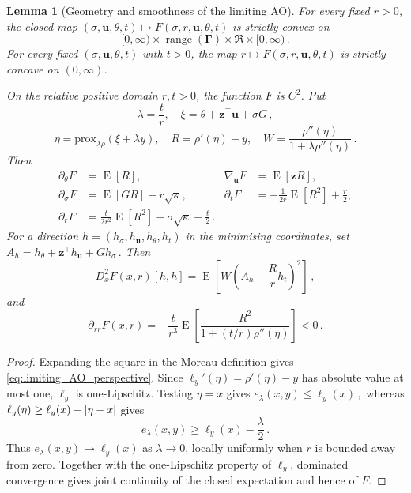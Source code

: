 \documentclass{article}
\makeatletter
\DeclareMathOperator{\expect}{E}
\newtheorem{lemma}{Lemma}
\theoremstyle{definition}
\newcommand{\abs}[1]{%
	\ensuremath{%
		\if@display
		\left| #1 \right|
		\else
		\lvert #1 \rvert
		\fi
	}%
}
\newcommand*{\bb}{\boldsymbol}
\newcommand{\prox}[2]{\ensuremath{\textrm{prox}_{#1}\left(#2\right)}}
\def\bu{\bb{u}}
\def\bz{\bb{z}}
\newcommand{\range}{\operatorname{range}}
\makeatother
\begin{document}
\begin{bibunit}
\begin{lemma}[Geometry and smoothness of the limiting AO]
For every fixed $r>0$, the closed map $(\sigma,\bu,\theta,t) \longmapsto F(\sigma,r,\bu,\theta,t)$
is strictly convex on
$$
    [0,\infty)
    \times\range(\bb\Gamma)
    \times\Re
    \times[0,\infty)\,.
$$
For every fixed $(\sigma,\bu,\theta,t)$ with $t>0$, the map $r\longmapsto F(\sigma,r,\bu,\theta,t)$
is strictly concave on $(0,\infty)$.

On the relative positive domain $r,t>0$, the function $F$ is $C^2$. Put
$$
    \lambda=\frac tr,
    \quad
    \xi=\theta+\bz^\top\bu+\sigma G\,,
$$
$$
    \eta
    =
    \prox{\lambda\rho}{\xi+\lambda y},
    \quad
    R=\rho'(\eta)-y,
    \quad
    W=
    \frac{\rho''(\eta)}{1+\lambda\rho''(\eta)}\,.
$$
Then
\begin{equation}
\label{eq:limiting_AO_gradient}
\begin{aligned}
    \partial_\theta F
    &=\expect[R],
    &
    \nabla_{\bu}F
    &=\expect[\bz R],
    \\
    \partial_\sigma F
    &=\expect[GR]-r\sqrt\kappa,
    &
    \partial_tF
    &=-\frac{1}{2r}\expect[R^2]+\frac r2,
    \\
    \partial_rF
    &=\frac{t}{2r^2}\expect[R^2]
      -\sigma\sqrt\kappa+\frac t2\,.
\end{aligned}
\end{equation}
For a direction $h=(h_\sigma,h_{\bu},h_\theta,h_t)$
in the minimising coordinates, set $A_h=h_\theta+\bz^\top h_{\bu}+Gh_\sigma\,.$
Then
\begin{equation}
\label{eq:limiting_AO_min_hessian}
    D_x^2F(x,r)[h,h]
    =
    \expect\left[
        W
        \left(
            A_h-\frac{R}{r}h_t
        \right)^2
    \right]\,,
\end{equation}
and
\begin{equation}
\label{eq:limiting_AO_r_hessian}
    \partial_{rr}F(x,r)
    =
    -\frac{t}{r^3}
    \expect\left[
        \frac{R^2}
        {1+(t/r)\rho''(\eta)}
    \right] <0\,.
\end{equation}
\end{lemma}

\begin{proof}
Expanding the square in the Moreau definition gives
\eqref{eq:limiting_AO_perspective}. Since $\ell_y'(\eta)=\rho'(\eta)-y$
has absolute value at most one, $\ell_y$ is one-Lipschitz. Testing
$\eta=x$ gives $e_\lambda(x,y)\leq\ell_y(x)\,,$
whereas $\ell_y(\eta) \geq \ell_y(x)-\abs{\eta-x}$
gives
$$
    e_\lambda(x,y)
    \geq
    \ell_y(x)-\frac\lambda2\,.
$$
Thus $e_\lambda(x,y)\to\ell_y(x)$ as $\lambda\to 0$, locally
uniformly when $r$ is bounded away from zero. Together with the
one-Lipschitz property of $\ell_y$, dominated convergence gives joint
continuity of the closed expectation and hence of $F$.


\end{proof}
\end{bibunit}
\end{document}
